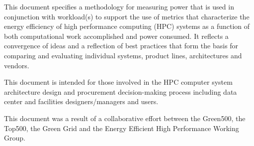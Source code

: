 \noindent
This document specifies a methodology for measuring power that is used in conjunction with workload(s) to support the use of metrics that characterize the energy efficiency of high performance computing (HPC) systems as a function of both computational work accomplished and power consumed. It reflects a convergence of ideas and a reflection of best practices that form the basis for comparing and evaluating individual systems, product lines, architectures and vendors. 
\wl

\noindent
This document is intended for those involved in the HPC computer system architecture design and procurement decision-making process including data center and facilities designers/managers and users.
\wl

\noindent
This document was a result of a collaborative effort between the Green500, the Top500, the Green Grid and the Energy Efficient High Performance Working Group.

